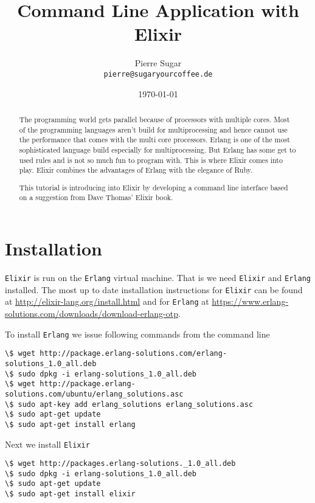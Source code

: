 \documentclass[10pt, a4paper]{article}
\begin{document}
\title{Command Line Application with Elixir}
\author{Pierre Sugar\\
\texttt{pierre@sugaryourcoffee.de}}
\date{\today}
\maketitle

\begin{abstract}
The programming world gets parallel because of processors with multiple cores.
Most of the programming languages aren't build for multiprocessing and hence
cannot use the performance that comes with the multi core processors. Erlang is
one of the most sophisticated language build especially for multiprocessing.
But Erlang has some get to used rules and is not so much fun to program with.
This is where Elixir comes into play. Elixir combines the advantages of Erlang
with the elegance of Ruby.

This tutorial is introducing into Elixir by developing a command line interface
based on a suggestion from Dave Thomas' Elixir book. 
\end{abstract}

\section{Installation}
\texttt{Elixir} is run on the \texttt{Erlang} virtual machine. That is we need
\texttt{Elixir} and \texttt{Erlang} installed. The most up to date installation
instructions for \texttt{Elixir} can be found at 
\url{http://elixir-lang.org/install.html} and for \texttt{Erlang} at
\url{https://www.erlang-solutions.com/downloads/download-erlang-otp}.

To install \texttt{Erlang} we issue following commands from the command line

\begin{verbatim}
\$ wget http://package.erlang-solutions.com/erlang-solutions_1.0_all.deb
\$ sudo dpkg -i erlang-solutions_1.0_all.deb
\$ wget http://package.erlang-solutions.com/ubuntu/erlang_solutions.asc
\$ sudo apt-key add erlang_solutions erlang_solutions.asc
\$ sudo apt-get update
\$ sudo apt-get install erlang
\end{verbatim}

Next we install \texttt{Elixir}

\begin{verbatim}
\$ wget http://packages.erlang-solutions._1.0_all.deb 
\$ sudo dpkg -i erlang-solutions_1.0_all.deb
\$ sudo apt-get update
\$ sudo apt-get install elixir
\end{verbatim}
\end{document}
